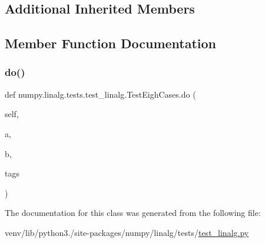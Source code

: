 \subsection*{Additional Inherited Members}


\subsection{Member Function Documentation}
\mbox{\label{classnumpy_1_1linalg_1_1tests_1_1test__linalg_1_1TestEighCases_a8cfaf60643f941853a65942ab2ea3459}} 
\subsubsection{\texorpdfstring{do()}{do()}}
{\footnotesize\ttfamily def numpy.\+linalg.\+tests.\+test\+\_\+linalg.\+Test\+Eigh\+Cases.\+do (\begin{DoxyParamCaption}\item[{}]{self,  }\item[{}]{a,  }\item[{}]{b,  }\item[{}]{tags }\end{DoxyParamCaption})}



The documentation for this class was generated from the following file\+:\begin{DoxyCompactItemize}
\item 
venv/lib/python3./site-\/packages/numpy/linalg/tests/\hyperlink{test__linalg_8py}{test\+\_\+linalg.\+py}\end{DoxyCompactItemize}
